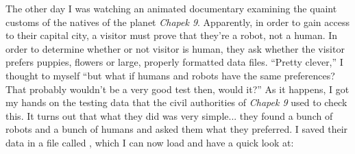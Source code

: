 \noindent
The other day I was watching an animated documentary examining the quaint customs of the natives of the planet {\it Chapek 9}. Apparently, in order to gain access to their capital city, a visitor must prove that they're a robot, not a human. In order to determine whether or not visitor is human, they ask whether the visitor prefers puppies, flowers or large, properly formatted data files. ``Pretty clever,'' I thought to myself ``but what if humans and robots have the same preferences? That probably wouldn't be a very good test then, would it?'' As it happens, I got my hands on the testing data that the civil authorities of {\it Chapek 9} used to check this. It turns out that what they did was very simple... they found a bunch of robots and a bunch of humans and asked them what they preferred. I saved their data in a file called , which I can now load and have a quick look at:

